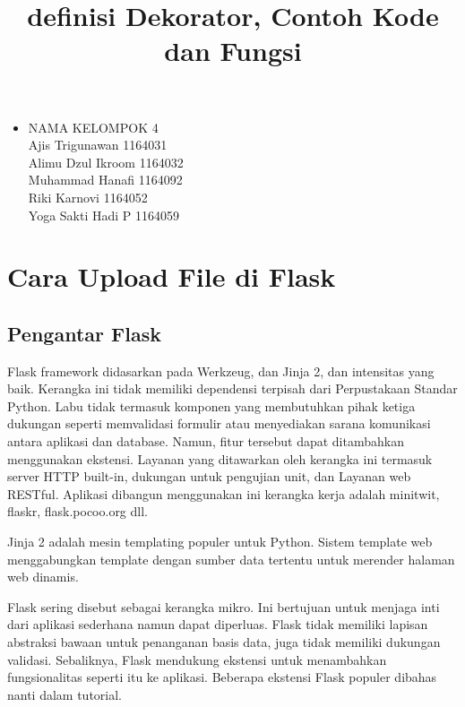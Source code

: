\documentclass[12pt,a4paper]{article}
\begin{document}
\title{definisi Dekorator, Contoh Kode dan Fungsi}
\maketitle

\begin{itemize}

\item
NAMA KELOMPOK 4\\
Ajis Trigunawan			1164031\\
Alimu Dzul Ikroom		1164032\\
Muhammad Hanafi			1164092\\
Riki Karnovi			1164052\\
Yoga Sakti Hadi P		1164059\\

\end{itemize}

\section{Cara Upload File di Flask}

\subsection{Pengantar Flask}

Flask framework didasarkan pada Werkzeug, dan Jinja 2, dan intensitas yang baik. Kerangka ini tidak memiliki dependensi terpisah dari
Perpustakaan Standar Python. Labu tidak termasuk komponen yang membutuhkan pihak ketiga dukungan seperti memvalidasi formulir atau menyediakan sarana komunikasi antara aplikasi dan database. Namun, fitur tersebut dapat ditambahkan menggunakan ekstensi. Layanan yang ditawarkan oleh kerangka ini termasuk server HTTP built-in, dukungan untuk pengujian unit, dan Layanan web RESTful. Aplikasi dibangun menggunakan ini kerangka kerja adalah minitwit, flaskr, flask.pocoo.org dll.

Jinja 2 adalah mesin templating populer untuk Python. Sistem template web menggabungkan template dengan sumber data tertentu untuk merender halaman web dinamis.

Flask sering disebut sebagai kerangka mikro. Ini bertujuan untuk menjaga inti dari aplikasi sederhana namun dapat diperluas. Flask tidak memiliki lapisan abstraksi bawaan untuk penanganan basis data, juga tidak memiliki dukungan validasi. Sebaliknya, Flask mendukung ekstensi untuk menambahkan fungsionalitas seperti itu ke aplikasi. Beberapa ekstensi Flask populer dibahas nanti dalam tutorial.
\end{document}
